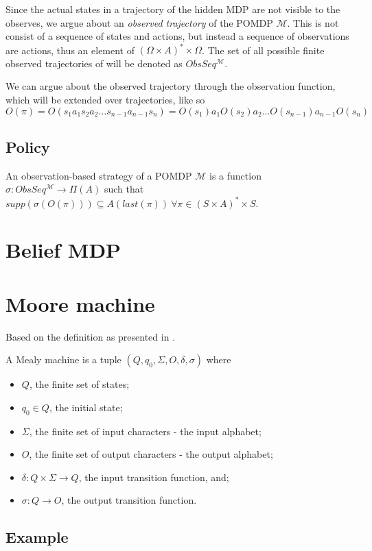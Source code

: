 Since the actual states in a trajectory of the hidden MDP are not visible to the observes, we argue about an \textit{observed trajectory} of the POMDP $\mathcal{M}$. This is not consist of a sequence of states and actions, but instead a sequence of observations are actions, thus an element of $(\Omega\times A)^*\times \Omega$. The set of all possible finite observed trajectories of will be denoted as $ObsSeq^{\mathcal{M}}$.

We can argue about the observed trajectory through the observation function, which will be extended over trajectories, like so
\[O(\pi)=O(s_1 a_1 s_2 a_2\dots s_{n-1} a_{n-1} s_n) = O(s_1) a_1 O(s_2) a_2\dots O(s_{n-1}) a_{n-1} O(s_n)\]

\subsection*{Policy}
\begin{definition}
	An observation-based strategy of a POMDP $\mathcal{M}$ is a function $\sigma:ObsSeq^{\mathcal{M}}\to\Pi(A)$ such that $supp(\sigma(O(\pi)))\subseteq A (last(\pi))\ \forall \pi\in(S\times A)^*\times S$.
\end{definition}

\section{Belief MDP}



\section{Moore machine}
Based on the definition as presented in \cite{p:moore}.
\begin{definition}
	A Mealy machine is a tuple $(Q,q_0,\Sigma,O,\delta,\sigma)$ where
	\begin{itemize}
		\item $Q$, the finite set of states;
		\item $q_0\in Q$, the initial state;
		\item $\Sigma$, the finite set of input characters - the input alphabet;
		\item $O$, the finite set of output characters - the output alphabet;
		\item $\delta: Q\times \Sigma\to Q$, the input transition function, and;
		\item $\sigma : Q\to O$, the output transition function.
	\end{itemize}
\end{definition}
\subsection*{Example}
